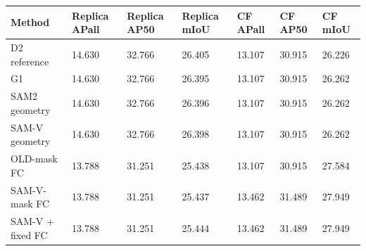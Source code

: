\begin{tabular}{lllllll}
\toprule
Method & Replica APall & Replica AP50 & Replica mIoU & CF APall & CF AP50 & CF mIoU \\
\midrule
D2 reference & 14.630 & 32.766 & 26.405 & 13.107 & 30.915 & 26.226 \\
G1 & 14.630 & 32.766 & 26.395 & 13.107 & 30.915 & 26.262 \\
SAM2 geometry & 14.630 & 32.766 & 26.396 & 13.107 & 30.915 & 26.262 \\
SAM-V geometry & 14.630 & 32.766 & 26.398 & 13.107 & 30.915 & 26.262 \\
OLD-mask FC & 13.788 & 31.251 & 25.438 & 13.107 & 30.915 & 27.584 \\
SAM-V-mask FC & 13.788 & 31.251 & 25.437 & 13.462 & 31.489 & 27.949 \\
SAM-V + fixed FC & 13.788 & 31.251 & 25.444 & 13.462 & 31.489 & 27.949 \\
\bottomrule
\end{tabular}
